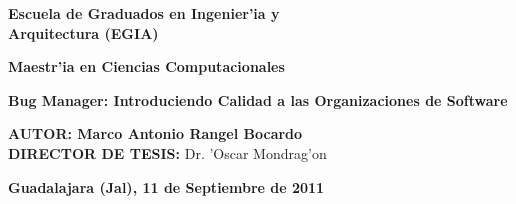 \begin{center}
\Large
\textbf{Escuela de Graduados en Ingenier'ia y\\ Arquitectura (EGIA)}\\
\vspace{20 pt}

\textbf{Maestr'ia en Ciencias Computacionales}\\
\vspace{42 pt}

\Huge
\textbf{Bug Manager: Introduciendo Calidad a las Organizaciones de Software}\\
\vspace{65 pt}

\Large
\begin{flushleft}
\hspace{5pt}\textbf{AUTOR: \hspace{28pt}Marco Antonio Rangel Bocardo}\\
\vspace{5pt}
\hspace{5pt}\textbf{DIRECTOR DE TESIS:} Dr. 'Oscar Mondrag'on\\
\end{flushleft}

\large
\vspace{20pt}
\textbf{Guadalajara (Jal), 11 de Septiembre de 2011}
\end{center}
\clearpage

\renewcommand{\baselinestretch}{1.5}